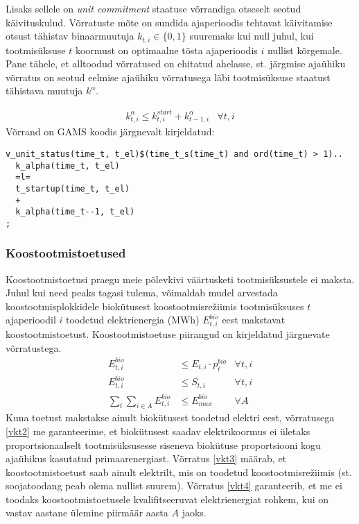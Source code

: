 \documentclass[10pt,a4paper]{article}
\begin{document}
Lisaks sellele on \emph{unit commitment} staatuse võrrandiga otseselt seotud käi\-vitus\-kulud. Võrratuste mõte on sundida ajaperioodis tehtavat käivita\-mise otsust tähistav binaarmuutuja $k_{t,i} \in \{0,1\}$ suuremaks kui null juhul, kui tootmisüksuse $t$ koormust on optimaalne tõsta ajaperioodis $i$ nullist kõrgemale. Pane tähele, et alltoodud võrratused on ehitatud ahelasse, st. järgmise ajaühiku võrratus on seotud eelmise ajaühiku võrratusega läbi tootmisüksuse staatust tähistava muutuja $k^\alpha$.

\begin{align}
k^\alpha_{t,i} \leq k^{start}_{t,i} + k^\alpha_{t-1,i} &\forall t,i
\end{align}
Võrrand on GAMS koodis järgnevalt kirjeldatud:
\begin{verbatim}
v_unit_status(time_t, t_el)$(time_t_s(time_t) and ord(time_t) > 1)..
  k_alpha(time_t, t_el)
  =l=
  t_startup(time_t, t_el)
  +
  k_alpha(time_t--1, t_el)
;
\end{verbatim}

\subsubsection{Koostootmistoetused}
Koostootmistoetusi praegu meie põlevkivi väärtusketi tootmisüksustele ei maksta. Juhul kui need peaks tagasi tulema, võimaldab mudel arvestada koostootmisplokkidele biokütusest koostootmisrežiimis tootmisüksuses $t$ ajaperioodil $i$ toodetud elektrienergia (MWh) $E^{bio}_{t,i}$ eest makstavat koostootmistoetust. Koostootmistoetuse piirangud on kirjeldatud järgnevate võrratustega.
\begin{align}
E^{bio}_{t,i} &\leq E_{t,i} \cdot p^{bio}_{t} & \forall t,i \label{vkt2} \\
E^{bio}_{t,i} &\leq S_{t,i} & \forall t,i \label{vkt3} \\
\sum_t \sum_{i \in A} E^{bio}_{t,i} &\leq E^{bio}_{max} & \forall A \label{vkt4}
\end{align}
Kuna toetust makstakse ainult biokütusest toodetud elektri eest, võrratusega \eqref{vkt2} me garanteerime, et biokütusest saadav elektrikoormus ei ületaks proportsionaalselt tootmisüksusesse siseneva biokütuse proportsiooni kogu ajaühikus kasutatud primaarenergiast.
Võrratus \eqref{vkt3} määrab, et koostootmistoetust saab ainult elektrilt, mis on toodetud koostootmisrežiimis (st. soojatoodang peab olema nullist suurem).
Võrratus \eqref{vkt4} garanteerib, et me ei toodaks koostootmistoetusele kvalifitseeruvat elektrienergiat rohkem, kui on vastav aastane ülemine piirmäär aasta $A$ jaoks.
\end{document}

